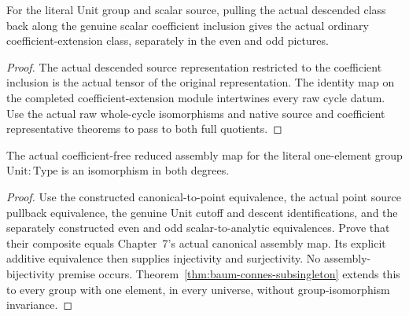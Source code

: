 \begin{proposition}\label{prop:unit-scalar-descent-calibration}
\leanok
For the literal Unit group and scalar source, pulling the actual descended
class back along the genuine scalar coefficient inclusion gives the actual
ordinary coefficient-extension class, separately in the even and odd pictures.
\end{proposition}
\begin{proof}
\leanok
The actual descended source representation restricted to the coefficient
inclusion is the actual tensor of the original representation. The identity
map on the completed coefficient-extension module intertwines every raw
cycle datum. Use the actual raw whole-cycle isomorphisms and native source
and coefficient representative theorems to pass to both full quotients.
\end{proof}

\begin{theorem}\label{thm:baum-connes-unit}
\leanok
The actual coefficient-free reduced assembly map for the literal one-element
group $\mathrm{Unit}:\mathrm{Type}$ is an isomorphism in both degrees.
\end{theorem}
\begin{proof}
\leanok
Use the constructed canonical-to-point equivalence, the actual point source
pullback equivalence, the genuine Unit cutoff and descent identifications,
and the separately constructed even and odd scalar-to-analytic equivalences.
Prove that their composite equals Chapter~7's actual canonical assembly map.
Its explicit additive equivalence then supplies injectivity and surjectivity.
No assembly-bijectivity premise occurs. Theorem~\ref{thm:baum-connes-subsingleton}
extends this to every group with one element, in every universe, without
group-isomorphism invariance.
\end{proof}

